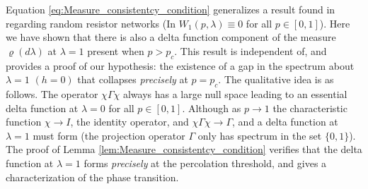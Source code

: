 \documentclass[english,12pt,jmp,graphicx]{revtex4-1}
\begin{document}
Equation \eqref{eq:Measure_consistentcy_condition} generalizes a
result found in \cite{Day:JPCM-96} regarding random resistor networks
(In \cite{Day:JPCM-96} $W_1(p,\lambda)\equiv0$ for all $p\in[0,1]$). Here we have
shown that there is also a delta function component of the measure
$\varrho(d\lambda)$ at $\lambda=1$ present when $p>p_c$. This result is independent of,
and provides a proof of our hypothesis: the existence of a gap in the
spectrum about $\lambda=1$ $(h=0)$ that collapses \emph{precisely} at
$p=p_c$. The qualitative idea is as follows. The operator $\chi\Gamma\chi$ always
has a large null space leading to an essential delta function at
$\lambda=0$ for all $p\in[0,1]$. Although as $p\to1$ the characteristic function
$\chi\to I$, the identity operator, and $\chi\Gamma\chi\to\Gamma$, and a delta function at
$\lambda=1$ must form (the projection operator $\Gamma$ only has spectrum in the
set $\{0,1\}$). The proof of Lemma
\eqref{lem:Measure_consistentcy_condition} verifies that the delta
function at $\lambda=1$ forms \emph{precisely} at the percolation threshold,
and gives a characterization of the phase transition.  
%


%
%

%



\end{document}
